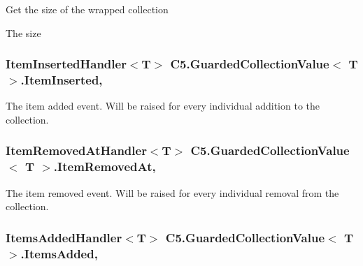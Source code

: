 Get the size of the wrapped collection 

The size\hypertarget{class_c5_1_1_guarded_collection_value_a3f96014a551bc419ff392b0603c5ea9b}{}
\subsubsection[{Item\+Inserted}]{\setlength{\rightskip}{0pt plus 5cm}Item\+Inserted\+Handler$<$T$>$ {\bf C5.\+Guarded\+Collection\+Value}$<$ T $>$.Item\+Inserted\hspace{0.3cm}{\ttfamily [add]}, {\ttfamily [remove]}}\label{class_c5_1_1_guarded_collection_value_a3f96014a551bc419ff392b0603c5ea9b}


The item added event. Will be raised for every individual addition to the collection. 

\hypertarget{class_c5_1_1_guarded_collection_value_ae775067415ed075eab5ff22ed0cde2a4}{}
\subsubsection[{Item\+Removed\+At}]{\setlength{\rightskip}{0pt plus 5cm}Item\+Removed\+At\+Handler$<$T$>$ {\bf C5.\+Guarded\+Collection\+Value}$<$ T $>$.Item\+Removed\+At\hspace{0.3cm}{\ttfamily [add]}, {\ttfamily [remove]}}\label{class_c5_1_1_guarded_collection_value_ae775067415ed075eab5ff22ed0cde2a4}


The item removed event. Will be raised for every individual removal from the collection. 

\hypertarget{class_c5_1_1_guarded_collection_value_aeb91b9e7ca3dfac470295adc96ab1dab}{}
\subsubsection[{Items\+Added}]{\setlength{\rightskip}{0pt plus 5cm}Items\+Added\+Handler$<$T$>$ {\bf C5.\+Guarded\+Collection\+Value}$<$ T $>$.Items\+Added\hspace{0.3cm}{\ttfamily [add]}, {\ttfamily [remove]}}\label{class_c5_1_1_guarded_collection_value_aeb91b9e7ca3dfac470295adc96ab1dab}


